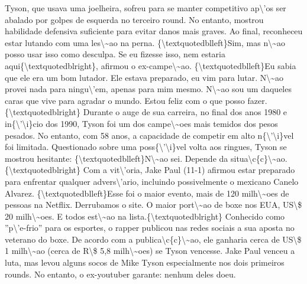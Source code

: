 \documentclass{article}%
\begin{document}
\newline%
Tyson, que usava uma joelheira, sofreu para se manter competitivo ap\textbackslash{}'os ser abalado por golpes de esquerda no terceiro round. No entanto, mostrou habilidade defensiva suficiente para evitar danos mais graves. Ao final, reconheceu estar lutando com uma les\textbackslash{}\textasciitilde{}ao na perna. \{\textbackslash{}textquotedblleft\}Sim, mas n\textbackslash{}\textasciitilde{}ao posso usar isso como desculpa. Se eu fizesse isso, nem estaria aqui\{\textbackslash{}textquotedblright\}, afirmou o ex{-}campe\textbackslash{}\textasciitilde{}ao. \{\textbackslash{}textquotedblleft\}Eu sabia que ele era um bom lutador. Ele estava preparado, eu vim para lutar. N\textbackslash{}\textasciitilde{}ao provei nada para ningu\textbackslash{}'em, apenas para mim mesmo. N\textbackslash{}\textasciitilde{}ao sou um daqueles caras que vive para agradar o mundo. Estou feliz com o que posso fazer.\{\textbackslash{}textquotedblright\}\newline%
\newline%
Durante o auge de sua carreira, no final dos anos 1980 e in\{\textbackslash{}'\textbackslash{}i\}cio dos 1990, Tyson foi um dos campe\textbackslash{}\textasciitilde{}oes mais temidos dos pesos pesados. No entanto, com 58 anos, a capacidade de competir em alto n\{\textbackslash{}'\textbackslash{}i\}vel foi limitada. Questionado sobre uma poss\{\textbackslash{}'\textbackslash{}i\}vel volta aos ringues, Tyson se mostrou hesitante: \{\textbackslash{}textquotedblleft\}N\textbackslash{}\textasciitilde{}ao sei. Depende da situa\textbackslash{}c\{c\}\textbackslash{}\textasciitilde{}ao.\{\textbackslash{}textquotedblright\}\newline%
\newline%
Com a vit\textbackslash{}'oria, Jake Paul (11{-}1) afirmou estar preparado para enfrentar qualquer advers\textbackslash{}'ario, incluindo possivelmente o mexicano Canelo Alvarez. \{\textbackslash{}textquotedblleft\}Esse foi o maior evento, mais de 120 milh\textbackslash{}\textasciitilde{}oes de pessoas na Netflix. Derrubamos o site. O maior port\textbackslash{}\textasciitilde{}ao de boxe nos EUA, US\textbackslash{}\$ 20 milh\textbackslash{}\textasciitilde{}oes. E todos est\textbackslash{}\textasciitilde{}ao na lista.\{\textbackslash{}textquotedblright\} Conhecido como ''p\textbackslash{}'e{-}frio'' para os esportes, o rapper publicou nas redes sociais a sua aposta no veterano do boxe. De acordo com a publica\textbackslash{}c\{c\}\textbackslash{}\textasciitilde{}ao, ele ganharia cerca de US\textbackslash{}\$ 1 milh\textbackslash{}\textasciitilde{}ao (cerca de R\textbackslash{}\$ 5,8 milh\textbackslash{}\textasciitilde{}oes) se Tyson vencesse. Jake Paul venceu a luta, mas levou alguns socos de Mike Tyson especialmente nos dois primeiros rounds. No entanto, o ex{-}youtuber garante: nenhum deles doeu.\newline%
\end{document}
